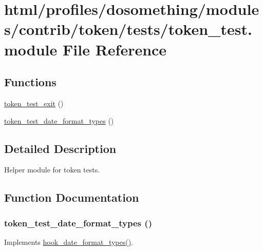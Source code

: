 \hypertarget{token__test_8module}{
\section{html/profiles/dosomething/modules/contrib/token/tests/token\_\-test.module File Reference}
\label{token__test_8module}
}
\subsection*{Functions}
\begin{DoxyCompactItemize}
\item 
\hyperlink{token__test_8module_a7f4bb649dcba805af1772ab18eea505d}{token\_\-test\_\-exit} ()
\item 
\hyperlink{token__test_8module_ae5274fe6510bcb89e53bd7e66c7deb43}{token\_\-test\_\-date\_\-format\_\-types} ()
\end{DoxyCompactItemize}


\subsection{Detailed Description}
Helper module for token tests. 

\subsection{Function Documentation}
\hypertarget{token__test_8module_ae5274fe6510bcb89e53bd7e66c7deb43}{
\subsubsection[{token\_\-test\_\-date\_\-format\_\-types}]{\setlength{\rightskip}{0pt plus 5cm}token\_\-test\_\-date\_\-format\_\-types ()}}
\label{token__test_8module_ae5274fe6510bcb89e53bd7e66c7deb43}
Implements \hyperlink{group__hooks_gaadde7af71d0b4f827cf7aac1c88c4d23}{hook\_\-date\_\-format\_\-types()}.

